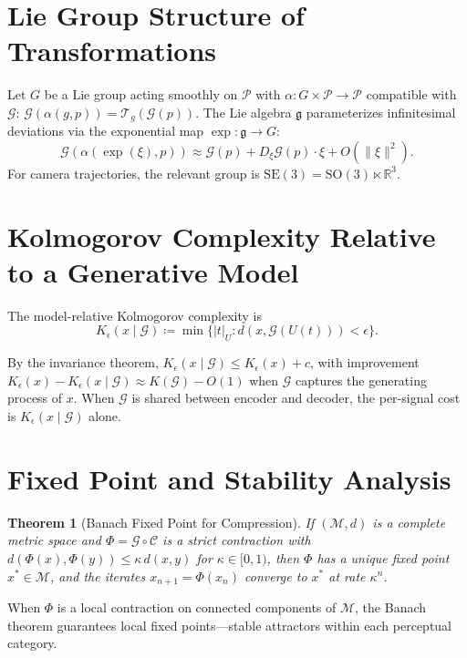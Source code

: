 \documentclass[11pt,a4paper]{article}
\newtheorem{theorem}{Theorem}[section]
\theoremstyle{definition}
\theoremstyle{remark}
\begin{document}
\section{Lie Group Structure of Transformations}
\label{app:lie}

Let $G$ be a Lie group acting smoothly on $\mathcal{P}$ with $\alpha : G \times \mathcal{P} \to \mathcal{P}$ compatible with $\mathcal{G}$: $\mathcal{G}(\alpha(g,p)) = \mathcal{T}_g(\mathcal{G}(p))$. The Lie algebra $\mathfrak{g}$ parameterizes infinitesimal deviations via the exponential map $\exp : \mathfrak{g} \to G$:
\[
\mathcal{G}(\alpha(\exp(\xi), p)) \approx \mathcal{G}(p) + D_\xi \mathcal{G}(p) \cdot \xi + O(\|\xi\|^2).
\]
For camera trajectories, the relevant group is $\mathrm{SE}(3) = \mathrm{SO}(3) \ltimes \mathbb{R}^3$.

\section{Kolmogorov Complexity Relative to a Generative Model}
\label{app:kolmogorov}

The model-relative Kolmogorov complexity is
\[
K_\epsilon(x \mid \mathcal{G}) \coloneqq \min \{ |t|_U : d(x, \mathcal{G}(U(t))) < \epsilon \}.
\]

By the invariance theorem, $K_\epsilon(x \mid \mathcal{G}) \le K_\epsilon(x) + c$, with improvement $K_\epsilon(x) - K_\epsilon(x \mid \mathcal{G}) \approx K(\mathcal{G}) - O(1)$ when $\mathcal{G}$ captures the generating process of $x$. When $\mathcal{G}$ is shared between encoder and decoder, the per-signal cost is $K_\epsilon(x \mid \mathcal{G})$ alone.

\section{Fixed Point and Stability Analysis}
\label{app:stability}

\begin{theorem}[Banach Fixed Point for Compression]
If $(\mathcal{M}, d)$ is a complete metric space and $\Phi = \mathcal{G} \circ \mathcal{C}$ is a strict contraction with $d(\Phi(x), \Phi(y)) \le \kappa \, d(x,y)$ for $\kappa \in [0,1)$, then $\Phi$ has a unique fixed point $x^* \in \mathcal{M}$, and the iterates $x_{n+1} = \Phi(x_n)$ converge to $x^*$ at rate $\kappa^n$.
\end{theorem}

When $\Phi$ is a local contraction on connected components of $\mathcal{M}$, the Banach theorem guarantees local fixed points---stable attractors within each perceptual category.
\end{document}
